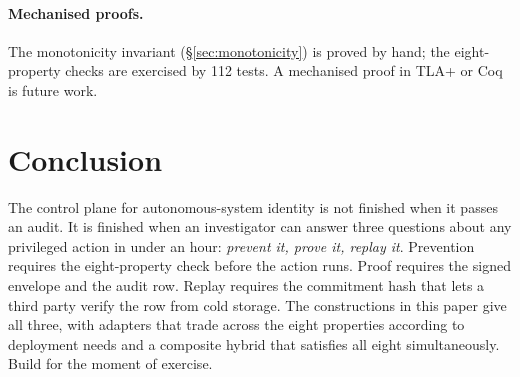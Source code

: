 \documentclass[11pt,a4paper]{article}
\begin{document}
\paragraph{Mechanised proofs.} The monotonicity invariant
(\S\ref{sec:monotonicity}) is proved by hand; the eight-property checks
are exercised by 112 tests. A mechanised proof in TLA+ or Coq is
future work.

\section{Conclusion}

The control plane for autonomous-system identity is not finished when it
passes an audit. It is finished when an investigator can answer three
questions about any privileged action in under an hour: \emph{prevent
it, prove it, replay it}. Prevention requires the eight-property check
before the action runs. Proof requires the signed envelope and the audit
row. Replay requires the commitment hash that lets a third party verify
the row from cold storage. The constructions in this paper give all
three, with adapters that trade across the eight properties according
to deployment needs and a composite hybrid that satisfies all eight
simultaneously. Build for the moment of exercise.



\end{document}

